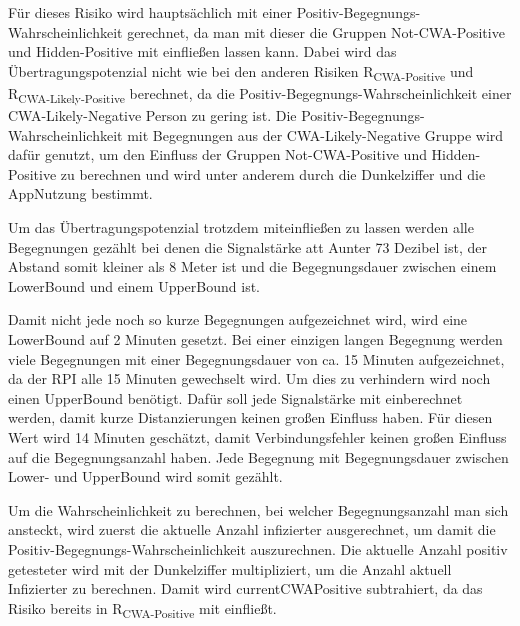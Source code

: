 \documentclass[conference]{IEEEtran}
\begin{document}
Für dieses Risiko wird hauptsächlich mit einer Positiv-Begegnungs-Wahrscheinlichkeit gerechnet,
da man mit dieser die Gruppen Not-CWA-Positive und Hidden-Positive mit einfließen lassen kann.
Dabei wird das Übertragungspotenzial nicht wie bei den anderen Risiken R\textsubscript{CWA-Positive} und R\textsubscript{CWA-Likely-Positive}  berechnet, 
da die Positiv-Begegnungs-Wahrscheinlichkeit einer CWA-Likely-Negative Person zu gering ist. 
Die Positiv-Begegnungs-Wahrscheinlichkeit mit Begegnungen aus der CWA-Likely-Negative Gruppe wird dafür genutzt, 
um den Einfluss der Gruppen Not-CWA-Positive und Hidden-Positive zu berechnen und wird unter anderem durch die Dunkelziffer und die AppNutzung bestimmt.

Um das Übertragungspotenzial trotzdem miteinfließen zu lassen werden alle Begegnungen gezählt bei denen die Signalstärke att Aunter 73 Dezibel ist,
der Abstand somit kleiner als 8 Meter ist und die Begegnungsdauer zwischen einem LowerBound und einem UpperBound ist. 

Damit nicht jede noch so kurze Begegnungen aufgezeichnet wird,
wird eine LowerBound auf 2 Minuten gesetzt. Bei einer einzigen langen Begegnung werden viele Begegnungen mit einer Begegnungsdauer von ca.
15 Minuten aufgezeichnet, da der RPI alle 15 Minuten gewechselt wird. Um dies zu verhindern wird noch einen UpperBound benötigt.
Dafür soll jede Signalstärke mit einberechnet werden, damit kurze Distanzierungen keinen großen Einfluss haben.
Für diesen Wert wird 14 Minuten geschätzt, damit Verbindungsfehler keinen großen Einfluss auf die Begegnungsanzahl haben.
Jede Begegnung mit Begegnungsdauer zwischen Lower- und UpperBound wird somit gezählt.

\centerline{\text{ }}



\text{\}}

\centerline{\text{ }}

Um die Wahrscheinlichkeit zu berechnen, bei welcher Begegnungsanzahl man sich ansteckt, wird zuerst die aktuelle Anzahl infizierter ausgerechnet, 
um damit die Positiv-Begegnungs-Wahrscheinlichkeit auszurechnen. 
Die aktuelle Anzahl positiv getesteter wird mit der Dunkelziffer multipliziert, 
um die Anzahl aktuell Infizierter zu berechnen. Damit wird currentCWAPositive subtrahiert, da das Risiko bereits in R\textsubscript{CWA-Positive} mit einfließt.  
\end{document}
